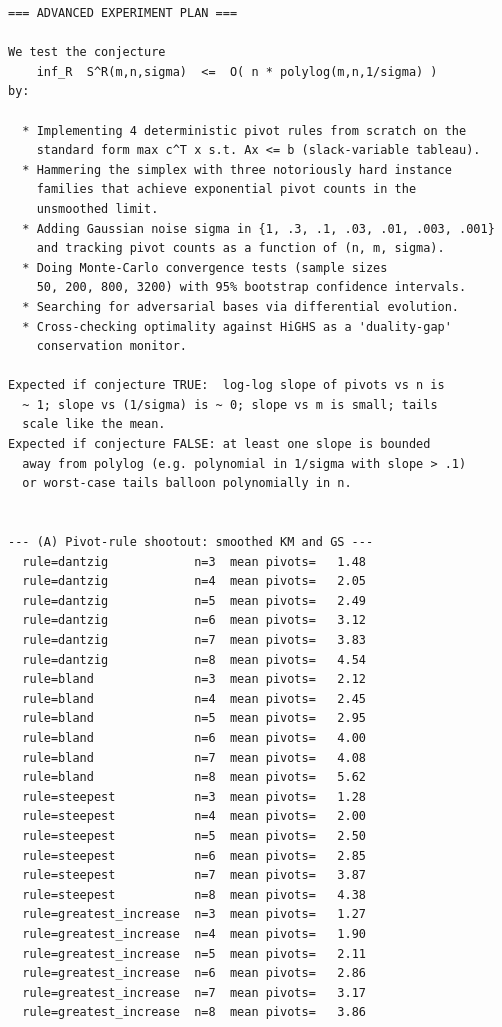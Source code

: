 \documentclass[11pt]{article}
\begin{document}
\begin{lstlisting}
=== ADVANCED EXPERIMENT PLAN ===

We test the conjecture
    inf_R  S^R(m,n,sigma)  <=  O( n * polylog(m,n,1/sigma) )
by:

  * Implementing 4 deterministic pivot rules from scratch on the
    standard form max c^T x s.t. Ax <= b (slack-variable tableau).
  * Hammering the simplex with three notoriously hard instance
    families that achieve exponential pivot counts in the
    unsmoothed limit.
  * Adding Gaussian noise sigma in {1, .3, .1, .03, .01, .003, .001}
    and tracking pivot counts as a function of (n, m, sigma).
  * Doing Monte-Carlo convergence tests (sample sizes
    50, 200, 800, 3200) with 95% bootstrap confidence intervals.
  * Searching for adversarial bases via differential evolution.
  * Cross-checking optimality against HiGHS as a 'duality-gap'
    conservation monitor.

Expected if conjecture TRUE:  log-log slope of pivots vs n is
  ~ 1; slope vs (1/sigma) is ~ 0; slope vs m is small; tails
  scale like the mean.
Expected if conjecture FALSE: at least one slope is bounded
  away from polylog (e.g. polynomial in 1/sigma with slope > .1)
  or worst-case tails balloon polynomially in n.


--- (A) Pivot-rule shootout: smoothed KM and GS ---
  rule=dantzig            n=3  mean pivots=   1.48
  rule=dantzig            n=4  mean pivots=   2.05
  rule=dantzig            n=5  mean pivots=   2.49
  rule=dantzig            n=6  mean pivots=   3.12
  rule=dantzig            n=7  mean pivots=   3.83
  rule=dantzig            n=8  mean pivots=   4.54
  rule=bland              n=3  mean pivots=   2.12
  rule=bland              n=4  mean pivots=   2.45
  rule=bland              n=5  mean pivots=   2.95
  rule=bland              n=6  mean pivots=   4.00
  rule=bland              n=7  mean pivots=   4.08
  rule=bland              n=8  mean pivots=   5.62
  rule=steepest           n=3  mean pivots=   1.28
  rule=steepest           n=4  mean pivots=   2.00
  rule=steepest           n=5  mean pivots=   2.50
  rule=steepest           n=6  mean pivots=   2.85
  rule=steepest           n=7  mean pivots=   3.87
  rule=steepest           n=8  mean pivots=   4.38
  rule=greatest_increase  n=3  mean pivots=   1.27
  rule=greatest_increase  n=4  mean pivots=   1.90
  rule=greatest_increase  n=5  mean pivots=   2.11
  rule=greatest_increase  n=6  mean pivots=   2.86
  rule=greatest_increase  n=7  mean pivots=   3.17
  rule=greatest_increase  n=8  mean pivots=   3.86


\end{lstlisting}
\end{document}
